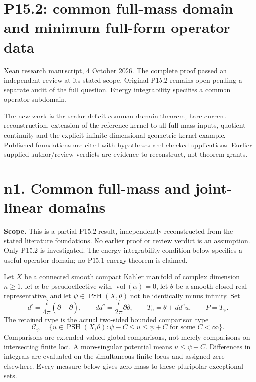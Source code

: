 \documentclass[
  11pt,
]{article}
\author{}
\date{}
\begin{document}
\section{P15.2: common full-mass domain and minimum full-form operator
data}\label{p15.2-common-full-mass-domain-and-minimum-full-form-operator-data}

Xean research manuscript, 4 October 2026. The complete proof passed an
independent review at its stated scope. Original P15.2 remains open
pending a separate audit of the full question. Energy integrability
specifies a common operator subdomain.

The new work is the scalar-deficit common-domain theorem, bare-current
reconstruction, extension of the reference kernel to all full-mass
inputs, quotient continuity and the explicit infinite-dimensional
geometric-kernel example. Published foundations are cited with
hypotheses and checked applications. Earlier supplied author/review
verdicts are evidence to reconstruct, not theorem grants.

\section{n1. Common full-mass and joint-linear
domains}\label{n1.-common-full-mass-and-joint-linear-domains}

\textbf{Scope.} This is a partial P15.2 result, independently
reconstructed from the stated literature foundations. No earlier proof
or review verdict is an assumption. Only P15.2 is investigated. The
energy integrability condition below specifies a useful operator domain;
no P15.1 energy theorem is claimed.

Let \(X\) be a connected smooth compact Kahler manifold of complex
dimension \(n\geq1\), let \(\alpha\) be pseudoeffective with
\(\operatorname{vol}(\alpha)=0\), let \(\theta\) be a smooth closed real
representative, and let \(\psi\in\operatorname{PSH}(X,\theta)\) not be
identically minus infinity. Set \[
d^c=\frac{i}{4\pi}(\bar\partial-\partial),\qquad dd^c=\frac{i}{2\pi}\partial\bar\partial,
\qquad T_u=\theta+dd^cu,\qquad P=T_\psi.
\] The retained type is the actual two-sided bounded comparison type \[
\mathcal{C}_\psi=\{u\in\operatorname{PSH}(X,\theta):\psi-C\leq u\leq\psi+C\text{ for some }C<\infty\}.
\] Comparisons are extended-valued global comparisons, not merely
comparisons on intersecting finite loci. A more-singular potential means
\(u\leq\psi+C\). Differences in integrals are evaluated on the
simultaneous finite locus and assigned zero elsewhere. Every measure
below gives zero mass to these pluripolar exceptional sets.
\end{document}
